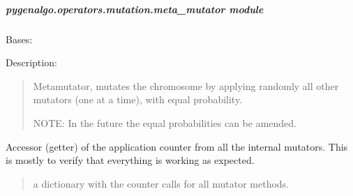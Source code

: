 \documentclass[letterpaper,10pt,english]{sphinxmanual}
\begin{document}
\subparagraph{pygenalgo.operators.mutation.meta\_mutator module}
\label{\detokenize{pygenalgo.operators.mutation:module-pygenalgo.operators.mutation.meta_mutator}}\label{\detokenize{pygenalgo.operators.mutation:pygenalgo-operators-mutation-meta-mutator-module}}

\begin{fulllineitems}
\label{\detokenize{pygenalgo.operators.mutation:pygenalgo.operators.mutation.meta_mutator.MetaMutator}}
\pysigstartsignatures
{}
\pysigstopsignatures
\sphinxAtStartPar
Bases: {\hyperref[\detokenize{pygenalgo.operators.mutation:pygenalgo.operators.mutation.mutate_operator.MutationOperator}]{}}

\sphinxAtStartPar
Description:
\begin{quote}

\sphinxAtStartPar
Meta\sphinxhyphen{}mutator, mutates the chromosome by applying randomly
all other mutators (one at a time), with equal probability.

\sphinxAtStartPar
NOTE: In the future the equal probabilities can be amended.
\end{quote}

\begin{fulllineitems}
\label{\detokenize{pygenalgo.operators.mutation:pygenalgo.operators.mutation.meta_mutator.MetaMutator.all_counters}}
\pysigstartsignatures
{}
\pysigstopsignatures
\sphinxAtStartPar
Accessor (getter) of the application counter from all the internal mutators.
This is mostly to verify that everything is working as expected.
\begin{quote}\begin{description}
\sphinxAtStartPar
a dictionary with the counter calls for all mutator methods.


\end{description}
\end{quote}
\end{fulllineitems}
\end{fulllineitems}
\end{document}
